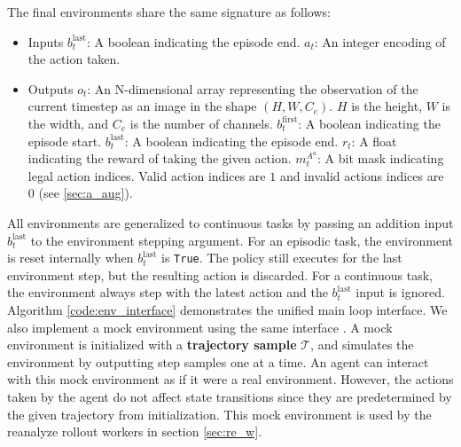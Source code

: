 The final environments share the same signature as follows:
\begin{itemize}
    \item Inputs
          \subitem $b^{\text{last}}_{t}$: A boolean indicating the episode end.
          \subitem $a_t$: An integer encoding of the action taken.
    \item Outputs
          \subitem $o_t$:
          An N-dimensional array representing the observation of the current timestep as an image
          in the shape $(H, W, C_e)$. $H$ is the height, $W$ is the width, and $C_e$ is the number of channels.
          \subitem $b^{\text{first}}_{t}$: A boolean indicating the episode start.
          \subitem $b^{\text{last}}_{t}$: A boolean indicating the episode end.
          \subitem $r_t$: A float indicating the reward of taking the given action.
          \subitem $m^{A^a}_t$: A bit mask indicating legal action indices. Valid
          action indices are $1$ and invalid actions indices are $0$ (see \ref{sec:a_aug}).
\end{itemize}

All environments are generalized to continuous tasks by passing an addition input $b^\text{last}_t$ to the environment stepping argument.
For an episodic task, the environment is reset internally when $b^{\text{last}}_t$ is \Verb|True|.
The policy still executes for the last environment step, but the resulting action is discarded.
For a continuous task, the environment always step with the latest action and the $b^{\text{last}}_t$ input is ignored.
Algorithm \ref{code:env_interface} demonstrates the unified main loop interface.
We also implement a mock environment using the same interface \cite{MockObject__2021}.
A mock environment is initialized with a \textbf{trajectory sample} $\mathcal{T}$, and simulates the environment by outputting step samples one at a time.
An agent can interact with this mock environment as if it were a real environment.
However, the actions taken by the agent do not affect state transitions since they are predetermined by the given trajectory from initialization.
This mock environment is used by the reanalyze rollout workers in section \ref{sec:re_w}.


